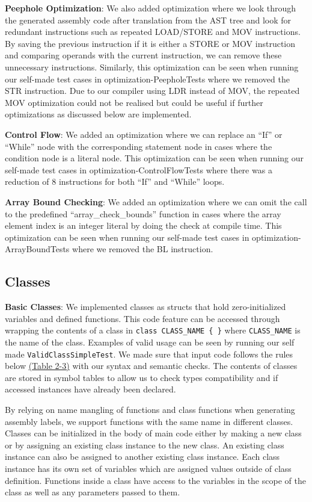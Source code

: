 \documentclass[11pt,a4paper]{article}
\newcommand{\cmd}[1]{\texttt{#1}}
\begin{document}
\noindent \textbf{Peephole Optimization}: We also added optimization where we look through the generated assembly code after translation from the AST tree and look for redundant instructions such as repeated LOAD/STORE and MOV instructions. By saving the previous instruction if it is either a STORE or MOV instruction and comparing operands with the current instruction, we can remove these unnecessary instructions. 
Similarly, this optimization can be seen when running our self-made test cases in optimization-PeepholeTests where we removed the STR instruction. Due to our compiler using LDR instead of MOV, the repeated MOV optimization could not be realised but could be useful if further optimizations as discussed below are implemented. 
\newline

\noindent \textbf{Control Flow}: We added an optimization where we can replace an “If” or “While” node with the corresponding statement node in cases where the condition node is a literal node. This optimization can be seen when running our self-made test cases in optimization-ControlFlowTests where there was a reduction of 8 instructions for both “If” and “While” loops.
\newline

\noindent \textbf{Array Bound Checking}: We added an optimization where we can omit the call to the predefined “array\_check\_bounds” function in cases where the array element index is an integer literal by doing the check at compile time. This optimization can be seen when running our self-made test cases in optimization-ArrayBoundTests where we removed the BL instruction.

\subsection{Classes}
\noindent \textbf{Basic Classes}: We implemented classes as structs that hold zero-initialized variables and defined functions. This code feature can be accessed through wrapping the contents of a class in \cmd{class CLASS\_NAME \{ \}} where \cmd{CLASS\_NAME} is the name of the class. Examples of valid usage can be seen by running our self made \cmd{ValidClassSimpleTest}. We made sure that input code follows the rules below \hyperref[sec:table23]{(Table 2-3)} with our syntax and semantic checks. The contents of classes are stored in symbol tables to allow us to check types compatibility and if accessed instances have already been declared.

By relying on name mangling of functions and class functions when generating assembly labels, we support functions with the same name in different classes. Classes can be initialized in the body of main code either by making a new class or by assigning an existing class instance to the new class. An existing class instance can also be assigned to another existing class instance. Each class instance has its own set of variables which are assigned values outside of class definition. Functions inside a class have access to the variables in the scope of the class as well as any parameters passed to them. 
\newline
\end{document}
